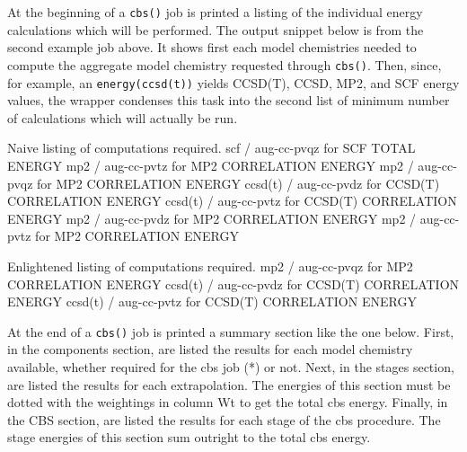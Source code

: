 
At the beginning of a \texttt{cbs()} job is printed a listing of the individual energy
calculations which will be performed. The output snippet below is from the second example
job above. It shows first each model chemistries 
needed to compute the aggregate model chemistry requested through \texttt{cbs()}. Then,
since, for example, an \texttt{energy(\qq ccsd(t)\qq)} yields CCSD(T), CCSD, MP2, and SCF
energy values, the wrapper condenses this task into the second list of minimum number of 
calculations which will actually be run.

\begin{Snippet}
    Naive listing of computations required.
            scf / aug-cc-pvqz              for  SCF TOTAL ENERGY
            mp2 / aug-cc-pvtz              for  MP2 CORRELATION ENERGY
            mp2 / aug-cc-pvqz              for  MP2 CORRELATION ENERGY
        ccsd(t) / aug-cc-pvdz              for  CCSD(T) CORRELATION ENERGY
        ccsd(t) / aug-cc-pvtz              for  CCSD(T) CORRELATION ENERGY
            mp2 / aug-cc-pvdz              for  MP2 CORRELATION ENERGY
            mp2 / aug-cc-pvtz              for  MP2 CORRELATION ENERGY

    Enlightened listing of computations required.
            mp2 / aug-cc-pvqz              for  MP2 CORRELATION ENERGY
        ccsd(t) / aug-cc-pvdz              for  CCSD(T) CORRELATION ENERGY
        ccsd(t) / aug-cc-pvtz              for  CCSD(T) CORRELATION ENERGY
\end{Snippet}

At the end of a \texttt{cbs()} job is printed a summary section like the one below. First,
in the components section, are listed the results for each model chemistry available, whether
required for the cbs job (*) or not. Next, in the stages section, are listed the results for
each extrapolation. The energies of this section must be dotted with the weightings in column Wt
to get the total cbs energy. Finally, in the CBS section, are listed the results for each stage
of the cbs procedure. The stage energies of this section sum outright to the total cbs energy.

